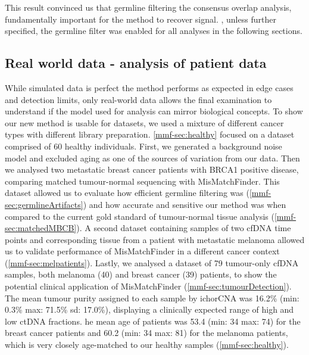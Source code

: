 This result convinced us that germline filtering the consensus overlap analysis,  fundamentally important for the method to recover  signal. , unless further specified, the germline filter was enabled for all analyses in the following sections.


\subsection{Real world data - analysis of patient data}
\label{mmf-sec:realworld}

While simulated data is perfect  the method performs as expected in edge cases and  detection limits, only real-world data allows the final examination to understand if the model used for analysis can mirror biological concepts. To show  our new method is usable for  datasets, we used a mixture of different cancer types with different library preparation. \autoref{mmf-sec:healthy} focused on  a dataset comprised of 60  healthy individuals. First, we generated a background noise model and excluded aging as one of the sources of variation from our data. Then we analysed two metastatic breast cancer patients with BRCA1 positive disease, comparing matched tumour-normal sequencing with MisMatchFinder. This dataset allowed us to evaluate how efficient germline filtering was (\autoref{mmf-sec:germlineArtifacts}) and how accurate and sensitive our method was when compared to the current gold standard of tumour-normal tissue analysis (\autoref{mmf-sec:matchedMBCB}).
A second dataset containing samples of two cfDNA time points and corresponding tissue from a patient with metastatic melanoma allowed us to validate  performance of MisMatchFinder in a different cancer context (\autoref{mmf-sec:melpatients}). Lastly, we analysed a dataset of 79 tumour-only cfDNA samples, both melanoma (40) and breast cancer (39) patients, to show the potential clinical application of MisMatchFinder (\autoref{mmf-sec:tumourDetection}). The mean tumour purity assigned to each sample by ichorCNA was 16.2\% (min: 0.3\% max: 71.5\% sd: 17.0\%), displaying a clinically expected range of high and low ctDNA fractions. he mean age of patients was 53.4 (min: 34 max: 74) for the breast cancer patients and 60.2 (min: 34 max: 81) for the melanoma patients, which is very closely age-matched to our healthy samples (\autoref{mmf-sec:healthy}).

